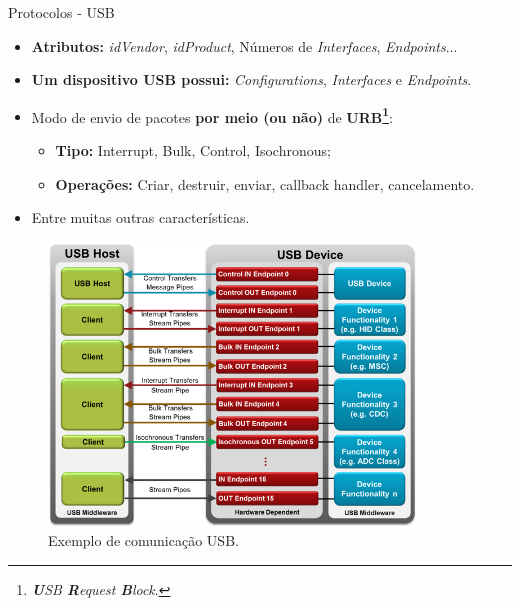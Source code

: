 	\begin{frame}{Protocolos - USB}
		\begin{itemize}
			\setlength\itemsep{1em}
			\item \textbf{Atributos:} \textit{idVendor}, \textit{idProduct}, Números de \textit{Interfaces}, \textit{Endpoints}...
			\item \textbf{Um dispositivo USB possui:} \textit{Configurations}, \textit{Interfaces} e \textit{Endpoints}.
			\item Modo de envio de pacotes \textbf{por meio (ou não)} de \textbf{URB\footnote{\textit{\textbf{U}SB \textbf{R}equest \textbf{B}lock}.}}:
			\begin{itemize}
				\setlength\itemsep{0.7em}
				\item \textbf{Tipo:} Interrupt, Bulk, Control, Isochronous;
				\item \textbf{Operações:} Criar, destruir, enviar, callback handler, cancelamento.
			\end{itemize}
			\item Entre muitas outras características.
		\end{itemize}
	\end{frame}
	\begin{frame}
		\begin{figure}[p]
			\centering
			\includegraphics[width=0.87\textwidth]{img/endpoint2.png}
			\caption{Exemplo de comunicação USB.}
			\label{fig:uart}
		\end{figure}
	\end{frame}
